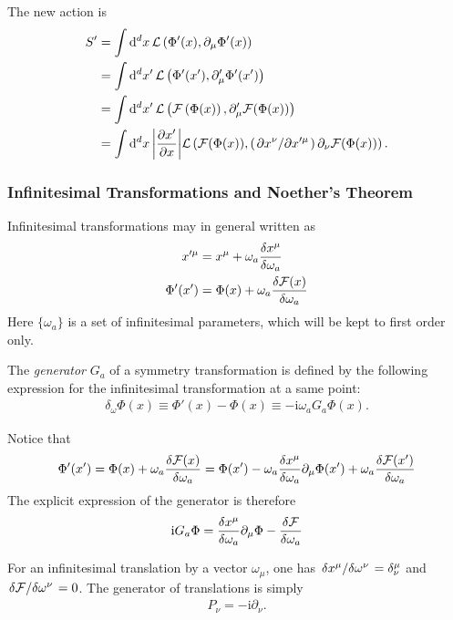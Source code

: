 \documentclass[10pt]{article}
\newcommand{\ii}{\mathrm{i}}
\begin{document}
The new action is 
\begin{align}
    S'&=\int\dd[d]{x}\mathcal{L}\left(\Phi'(x),\partial_\mu\Phi'(x)\right)\notag\\
        &=\int\dd[d]{x'}\mathcal{L}\left(\Phi'(x'),\partial'_\mu\Phi'(x')\right)\notag\\
        &=\int\dd[d]{x'}\mathcal{L}\left(\mathcal{F}\left(\Phi(x)\right),\partial'_\mu\mathcal{F}(\Phi(x))\right)\notag\\
        &=\int\dd[d]{x}\abs{\pdv{x'}{x}}\mathcal{L}\left(\mathcal{F}(\Phi(x)),\left(\pdv*{x^\nu}{x'^\mu}\right)\partial_\nu\mathcal{F}(\Phi(x))\right).\label{eq:CST:new_action}
\end{align}
\subsubsection{Infinitesimal Transformations and Noether's Theorem}
Infinitesimal transformations may in general written as 
\begin{align}
    x'^\mu&=x^\mu+\omega_a\fdv{x^\mu}{\omega_a}\label{eq:CST:x_prime}\\
    \Phi'(x')&=\Phi(x)+\omega_a \fdv{\mathcal{F}(x)}{\omega_a}\label{eq:CST:phi_prime} 
\end{align}
Here $\{\omega_a\}$ is a set of infinitesimal parameters, which will be kept to first order only.
\begin{definition}\label{def:generator_of_a_symmetry_transformation}
    The \textit{generator} $G_a$ of a symmetry transformation is defined by the following expression for the infinitesimal transformation at a same point:
    \begin{align}
        \delta_\omega\Phi(x)\equiv\Phi'(x)-\Phi(x)\equiv-\ii\omega_a G_a\Phi(x).
    \end{align}
\end{definition}
Notice that 
\begin{align}
    \Phi'(x')=\Phi(x)+\omega_a \fdv{\mathcal{F}(x)}{\omega_a}=\Phi(x')-\omega_a\fdv{x^\mu}{\omega_a}\partial_\mu\Phi(x')+\omega_a\fdv{\mathcal{F}(x')}{\omega_a}
\end{align}
The explicit expression of the generator is therefore 
\begin{align}
    \ii G_a\Phi=\fdv{x^\mu}{\omega_a}\partial_\mu\Phi-\fdv{\mathcal{F}}{\omega_a}
\end{align}
\begin{example}
    For an infinitesimal translation by a vector $\omega_\mu$, one has $\fdv*{x^\mu}{\omega^\nu}=\delta^\mu_\nu$ and $\fdv*{\mathcal{F}}{\omega^\nu}=0$.
    The generator of translations is simply
    \begin{align}
        P_\nu=-\ii\partial_\nu.
    \end{align}
\end{example}
\end{document}
